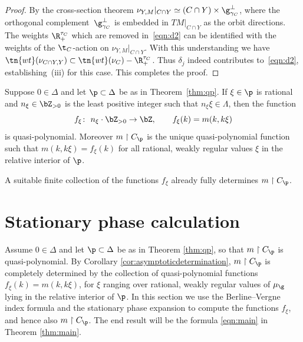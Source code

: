 \begin{proof}
By the cross-section theorem $\nu_{Y,M}|_{C\cap Y}\simeq (C\cap Y)\times \g_{\gamma_C}^\perp$, where the orthogonal comple\-ment~$\g_{\gamma_C}^\perp$ is embedded in $TM|_{C\cap Y}$ as the orbit directions. The weights $\R_+^{\tau_C}$ which are removed in~\eqref{eqn:d2} can be identified with the weights of the $\t_C$-action on $\nu_{Y,M}|_{C\cap Y}$. With this understanding we have $\tn{wt}(\nu_{C\cap Y,Y})\subset \tn{wt}(\nu_C)-\R_+^{\tau_C}$. Thus $\delta_j$ indeed contributes to~\eqref{eqn:d2}, establishing~(iii) for this case. This completes the proof.
\end{proof}

\begin{Corollary}\label{cor:asymptoticdetermination}Suppose $0 \in \Delta$ and let $\p \subset \Delta$ be as in Theorem~{\rm \ref{thm:qp}}. If $\xi \in \p$ is rational and $n_\xi \in \bZ_{>0}$ is the least positive integer such that $n_\xi \xi \in \Lambda$, then the function
\[ f_\xi \colon \ n_\xi\cdot \bZ_{>0}\rightarrow \bZ, \qquad f_\xi(k)=m(k,k\xi) \]
is quasi-polynomial. Moreover $m\upharpoonright C_\p$ is the unique quasi-polynomial function such that $m(k,k\xi)\allowbreak =f_\xi(k)$ for all rational, weakly regular values $\xi$ in the relative interior of $\p$.
\end{Corollary}
\begin{Remark}A suitable finite collection of the functions $f_\xi$ already fully determines $m \upharpoonright C_\p$.
\end{Remark}

\section{Stationary phase calculation}\label{sec:statphase}
Assume $0 \in \Delta$ and let $\p \subset \Delta$ be as in Theorem \ref{thm:qp}, so that $m \upharpoonright C_\p$ is quasi-polynomial. By Corollary \ref{cor:asymptoticdetermination}, $m \upharpoonright C_\p$ is completely determined by the collection of quasi-polynomial functions $f_\xi(k)=m(k,k\xi)$, for $\xi$ ranging over rational, weakly regular values of $\mu_\g$ lying in the relative interior of $\p$. In this section we use the Berline--Vergne index formula and the stationary phase expansion to compute the functions $f_\xi$, and hence also $m \upharpoonright C_\p$. The end result will be the formula \eqref{eqn:main} in Theorem \ref{thm:main}.

